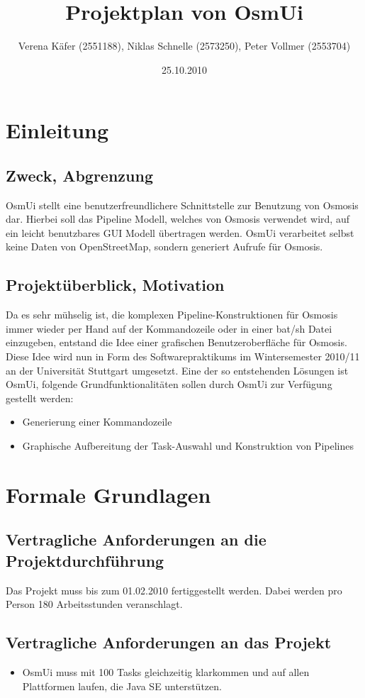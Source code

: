 \documentclass[a4paper,10pt]{scrartcl}
\author{Verena Käfer (2551188), Niklas Schnelle (2573250), Peter Vollmer (2553704)}
\date{25.10.2010}
\title{Projektplan von OsmUi}
\begin{document}
\maketitle
\newpage
\tableofcontents
\newpage


\section{Einleitung}
\subsection{Zweck, Abgrenzung}
OsmUi stellt eine benutzerfreundlichere Schnittstelle zur Benutzung von Osmosis dar. Hierbei soll das Pipeline Modell, welches von Osmosis verwendet wird, auf ein leicht benutzbares GUI Modell übertragen werden.
OsmUi verarbeitet selbst keine Daten von OpenStreetMap, sondern generiert Aufrufe für Osmosis. 
\subsection{Projektüberblick, Motivation}
Da es sehr mühselig ist, die komplexen Pipeline-Konstruktionen für Osmosis immer wieder per Hand auf der Kommandozeile oder in einer bat/sh Datei einzugeben, 
entstand die Idee einer grafischen Benutzeroberfläche für Osmosis.
Diese Idee wird nun in Form des Softwarepraktikums im Wintersemester 2010/11 an der Universität Stuttgart umgesetzt.
Eine der so entstehenden Lösungen ist OsmUi, folgende Grundfunktionalitäten sollen durch OsmUi zur Verfügung gestellt werden:
\begin{itemize}
\item Generierung einer Kommandozeile
\item Graphische Aufbereitung der Task-Auswahl und Konstruktion von Pipelines
\end{itemize}

\section{Formale Grundlagen}
\subsection{Vertragliche Anforderungen an die Projektdurchführung}
Das Projekt muss bis zum 01.02.2010 fertiggestellt werden. Dabei werden pro Person 180 Arbeitsstunden veranschlagt.
\subsection{Vertragliche Anforderungen an das Projekt}
\begin{itemize}
\item OsmUi muss mit 100 Tasks gleichzeitig klarkommen und auf allen Plattformen laufen, die Java SE unterstützen.  
\end{itemize}
\end{document}
